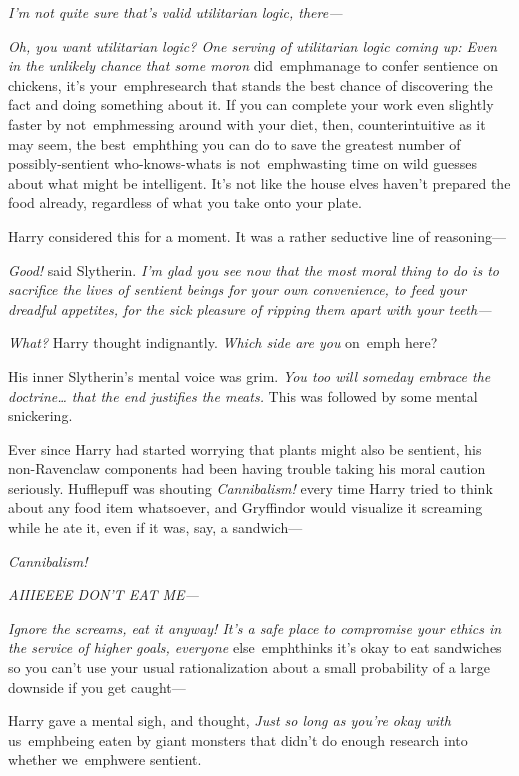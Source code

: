 \emph{I'm not quite sure that's valid utilitarian logic, there---}

\emph{Oh, you want utilitarian logic? One serving of utilitarian logic coming 
up: Even in the unlikely chance that some moron} did\ emph{manage to confer 
sentience on chickens, it's} your\ emph{research that stands the best chance of 
discovering the fact and doing something about it. If you can complete your 
work even slightly faster by} not\ emph{messing around with your diet, then, 
counterintuitive as it may seem, the} best\ emph{thing you can do to save the 
greatest number of possibly-sentient who-knows-whats is} not\ emph{wasting time 
on wild guesses about what might be intelligent. It's not like the house elves 
haven't prepared the food already, regardless of what you take onto your plate.}

Harry considered this for a moment. It was a rather seductive line of 
reasoning---

\emph{Good!} said Slytherin. \emph{I'm glad you see now that the most moral 
thing to do is to sacrifice the lives of sentient beings for your own 
convenience, to feed your dreadful appetites, for the sick pleasure of ripping 
them apart with your teeth---}

\emph{What?} Harry thought indignantly. \emph{Which side are you} on\ emph{
here?}

His inner Slytherin's mental voice was grim. \emph{You too will someday embrace 
the doctrine{\ldots} that the end justifies the meats.} This was followed by 
some mental snickering.

Ever since Harry had started worrying that plants might also be sentient, his 
non-Ravenclaw components had been having trouble taking his moral caution 
seriously. Hufflepuff was shouting \emph{Cannibalism!} every time Harry tried 
to think about any food item whatsoever, and Gryffindor would visualize it 
screaming while he ate it, even if it was, say, a sandwich---

\emph{Cannibalism!}

\emph{AIIIEEEE DON'T EAT ME---}

\emph{Ignore the screams, eat it anyway! It's a safe place to compromise your 
ethics in the service of higher goals, everyone} else\ emph{thinks it's okay to 
eat sandwiches so you can't use your usual rationalization about a small 
probability of a large downside if you get caught---}

Harry gave a mental sigh, and thought, \emph{Just so long as you're okay with} 
us\ emph{being eaten by giant monsters that didn't do enough research into 
whether} we\ emph{were sentient.}

